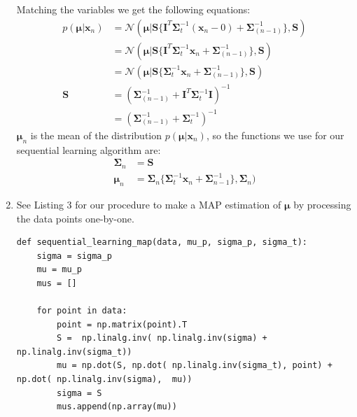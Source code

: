 \documentclass[a4paper,10pt]{article}
\numberwithin{equation}{section} %
\numberwithin{figure}{section} %
\numberwithin{table}{section} %
\theoremstyle{mytheor}
\begin{document}
\begin{enumerate}
		Matching the variables we get the following equations:
		\begin{align}
			p(\boldsymbol{\mu} | \boldsymbol{x}_n) &= \mathcal{N}(\boldsymbol{\mu} | \boldsymbol S \{ \boldsymbol{I}^T \boldsymbol{\Sigma}_t^{-1}(\boldsymbol{x}_n - 0) + \boldsymbol{\Sigma}_{(n-1)}^{-1}\}, \boldsymbol S)\\
			&= \mathcal{N}(\boldsymbol{\mu} | \boldsymbol S \{ \boldsymbol{I}^T \boldsymbol{\Sigma}_t^{-1} \boldsymbol{x}_n + \boldsymbol{\Sigma}_{(n-1)}^{-1}\}, \boldsymbol S)\\
			 &= \mathcal{N}(\boldsymbol{\mu} | \boldsymbol S \{ \boldsymbol{\Sigma}_t^{-1} \boldsymbol{x}_n + \boldsymbol{\Sigma}_{(n-1)}^{-1}\}, \boldsymbol S)\\
			\boldsymbol{S} &= (\boldsymbol{\Sigma}_{(n-1)}^{-1} + \boldsymbol{I}^T \boldsymbol{\Sigma}_t^{-1} \boldsymbol{I})^{-1}\\
			&= (\boldsymbol{\Sigma}_{(n-1)}^{-1} + \boldsymbol{\Sigma}_t^{-1})^{-1}
		\end{align}
		$\boldsymbol \mu_n$ is the mean of the distribution $p(\boldsymbol \mu | \boldsymbol x_n)$, so the functions we use for our sequential learning algorithm are:
		\begin{align}
			\boldsymbol \Sigma_n &= \boldsymbol S\\
			\boldsymbol \mu_n &= \boldsymbol \Sigma_n \{ \boldsymbol \Sigma_t^{-1} \boldsymbol x_n + \boldsymbol{\Sigma}_{n-1}^{-1}\}, \boldsymbol \Sigma_n)
		\end{align}
	\item See Listing 3 for our procedure to make a MAP estimation of $\boldsymbol \mu$ by processing the data points one-by-one. \begin{lstlisting}[label={list:first},caption=Python code for function \textit{sequential\_learning\_map(data, mu\_p, sigma\_p, sigma\_t)}.]
def sequential_learning_map(data, mu_p, sigma_p, sigma_t):
    sigma = sigma_p
    mu = mu_p
    mus = []

    for point in data:
        point = np.matrix(point).T
        S =  np.linalg.inv( np.linalg.inv(sigma) + np.linalg.inv(sigma_t))
        mu = np.dot(S, np.dot( np.linalg.inv(sigma_t), point) + np.dot( np.linalg.inv(sigma),  mu))
        sigma = S
        mus.append(np.array(mu))


\end{lstlisting}
\end{enumerate}
\end{document}
